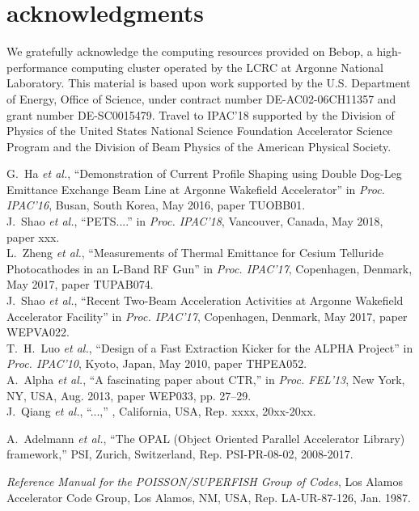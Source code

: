 \documentclass[letterpaper,  %
              ]{jacow-2_3}   %
\begin{document}
\section{acknowledgments}
We gratefully acknowledge the computing resources
provided on Bebop, a high-performance computing cluster
operated by the LCRC at Argonne National Laboratory.
This material is based upon work supported by the 
U.S. Department of Energy, Office of Science, under 
contract number DE-AC02-06CH11357 and grant number DE-SC0015479. 
Travel to IPAC'18 supported by the Division of Physics 
of the United States National Science Foundation 
Accelerator Science Program and the Division of 
Beam Physics of the American Physical Society.


\begin{thebibliography}{9}
G.~Ha \emph{et al.}, “Demonstration of Current Profile 
Shaping using Double Dog-Leg Emittance Exchange Beam 
Line at Argonne Wakefield Accelerator”
in \textit{Proc. IPAC’16}, 
Busan, South Korea, May 2016, 
paper TUOBB01.\\



J.~Shao \emph{et al.}, “PETS....”
in \textit{Proc. IPAC’18}, 
Vancouver, Canada, May 2018, 
paper xxx.\\

L.~Zheng \emph{et al.}, “Measurements of Thermal Emittance 
for Cesium Telluride Photocathodes in an L-Band RF Gun”
in \textit{Proc. IPAC’17}, 
Copenhagen, Denmark, May 2017, 
paper TUPAB074.\\

J.~Shao \emph{et al.}, “Recent Two-Beam 
Acceleration Activities at Argonne Wakefield Accelerator Facility”
in \textit{Proc. IPAC’17}, 
Copenhagen, Denmark, May 2017, 
paper WEPVA022.\\

T.~H.~Luo \emph{et al.}, “Design of a Fast
Extraction Kicker for the ALPHA Project”
in \textit{Proc. IPAC’10}, 
Kyoto, Japan, May 2010, 
paper THPEA052.\\

A.~Alpha \emph{et al.}, 
“A fascinating paper about CTR,”
in \emph{Proc. FEL’13}, 
New York, NY, USA, Aug. 2013, 
paper WEP033, pp. 27--29.\\

J.~Qiang \emph{et al.},
“...,”
, California, USA,
Rep. xxxx, 20xx-20xx.

A.~Adelmann \emph{et al.},
“The OPAL (Object Oriented Parallel Accelerator Library) framework,”
PSI, Zurich, Switzerland,
Rep. PSI-PR-08-02, 2008-2017.

\emph{Reference Manual for the POISSON/SUPERFISH Group of 
	Codes},  Los Alamos Accelerator Code Group,  
 Los Alamos, NM, USA, 
 Rep. LA-UR-87-126, Jan. 1987.
\end{thebibliography}
\end{document}
